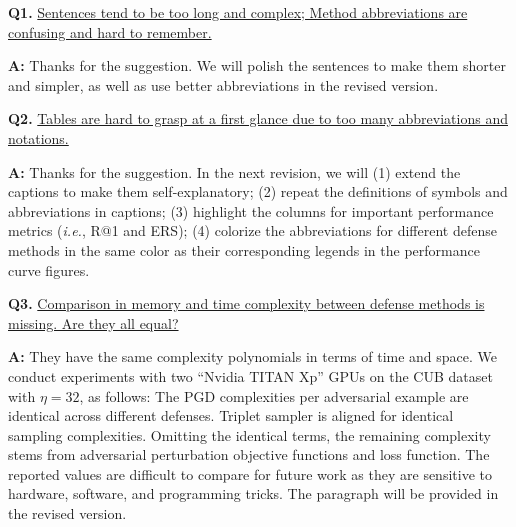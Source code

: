 \documentclass[10pt,twocolumn,letterpaper]{article}
\begin{document}
\noindent\textbf{Q1.}
%
\ul{
Sentences tend to be too long and complex; Method abbreviations are confusing
and hard to remember.
}

\noindent\textbf{A:} Thanks for the suggestion. We will polish the sentences to make
them shorter and simpler, as well as use better abbreviations in the 
revised version.

\noindent\textbf{Q2.}
%
\ul{
Tables are hard to grasp at a first glance due to too many abbreviations and
notations.
}

\noindent\textbf{A:} Thanks for the suggestion.
In the next revision, we will (1) extend the captions to make them
self-explanatory; (2) repeat the definitions of symbols and abbreviations in
captions; (3) highlight the columns for important performance metrics
(\emph{i.e.}, R@1 and ERS); (4) colorize the abbreviations for different
defense methods in the same color as their corresponding legends in the
performance curve figures. 

\noindent\textbf{Q3.}
%
\ul{
Comparison in memory and time complexity between defense methods is missing. Are they all
equal?
}

\noindent\textbf{A:}
%
They have the same complexity polynomials in terms of time and space.
%
We conduct experiments with two ``Nvidia TITAN Xp'' GPUs on the CUB dataset
with $\eta{=}32$, as follows:
%
\noindent%
%
The PGD complexities per adversarial
example are identical across different defenses.
%
Triplet sampler is aligned for identical sampling complexities.
%
Omitting the identical terms, the remaining complexity stems from adversarial perturbation objective functions and loss function.
%
The reported values are difficult to compare for future work as they are sensitive
to hardware, software, and programming tricks.
%
The paragraph will be provided in the revised version.
\end{document}
